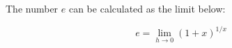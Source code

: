 \documentclass{article}
\begin{document}
\thispagestyle{empty}

\noindent
The number $e$ can be calculated as the limit below:
\newline

\begin{equation*}
    e = \lim_{h \to 0} \left( 1 + x \right) ^ {1/x}
\end{equation*}
\end{document}
